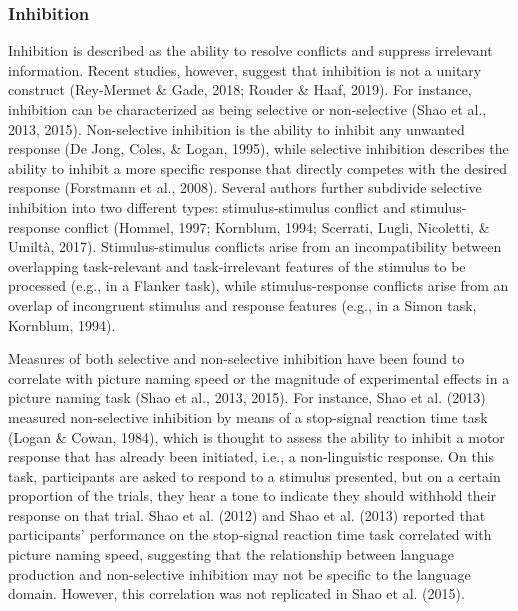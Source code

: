 \documentclass[
  man,floatsintext]{apa6}
\begin{document}
\hypertarget{inhibition}{%
\subsubsection{Inhibition}\label{inhibition}}

Inhibition is described as the ability to resolve conflicts and suppress irrelevant information. Recent studies, however, suggest that inhibition is not a unitary construct (Rey-Mermet \& Gade, 2018; Rouder \& Haaf, 2019). For instance, inhibition can be characterized as being selective or non-selective (Shao et al., 2013, 2015). Non-selective inhibition is the ability to inhibit any unwanted response (De Jong, Coles, \& Logan, 1995), while selective inhibition describes the ability to inhibit a more specific response that directly competes with the desired response (Forstmann et al., 2008). Several authors further subdivide selective inhibition into two different types: stimulus-stimulus conflict and stimulus-response conflict (Hommel, 1997; Kornblum, 1994; Scerrati, Lugli, Nicoletti, \& Umiltà, 2017). Stimulus-stimulus conflicts arise from an incompatibility between overlapping task-relevant and task-irrelevant features of the stimulus to be processed (e.g., in a Flanker task), while stimulus-response conflicts arise from an overlap of incongruent stimulus and response features (e.g., in a Simon task, Kornblum, 1994).

Measures of both selective and non-selective inhibition have been found to correlate with picture naming speed or the magnitude of experimental effects in a picture naming task (Shao et al., 2013, 2015). For instance, Shao et al. (2013) measured non-selective inhibition by means of a stop-signal reaction time task (Logan \& Cowan, 1984), which is thought to assess the ability to inhibit a motor response that has already been initiated, i.e., a non-linguistic response. On this task, participants are asked to respond to a stimulus presented, but on a certain proportion of the trials, they hear a tone to indicate they should withhold their response on that trial. Shao et al. (2012) and Shao et al. (2013) reported that participants' performance on the stop-signal reaction time task correlated with picture naming speed, suggesting that the relationship between language production and non-selective inhibition may not be specific to the language domain. However, this correlation was not replicated in Shao et al. (2015).
\end{document}
